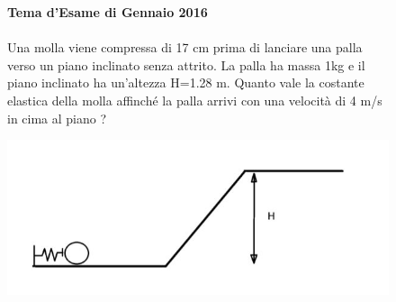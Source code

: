 
\begin{figure}[h!]
    \textbf{Tema d'Esame di Gennaio 2016}\\ \\
    Una molla viene compressa di 17 cm prima di lanciare una palla verso un piano inclinato
    senza attrito. La palla ha massa 1kg e il piano inclinato ha un'altezza H=1.28 m. Quanto vale
    la costante elastica della molla affinché la palla arrivi con una velocità di 4 m/s in cima al
    piano ?
    \\
        \begin{center}
            \includegraphics[scale=0.5]{ES2/GEN022016.jpg}
        \end{center}
    \end{figure}
    

